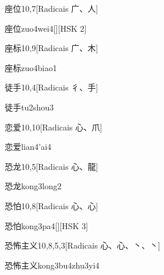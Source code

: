 \begin{entry}{座位}{10,7}[Radicais ⼴、⼈]
  \begin{phonetics}{座位}{zuo4wei4}[][HSK 2]
  \end{phonetics}
\end{entry}

\begin{entry}{座标}{10,9}[Radicais ⼴、⽊]
  \begin{phonetics}{座标}{zuo4biao1}
  \end{phonetics}
\end{entry}

\begin{entry}{徒手}{10,4}[Radicais ⼻、⼿]
  \begin{phonetics}{徒手}{tu2shou3}
  \end{phonetics}
\end{entry}

\begin{entry}{恋爱}{10,10}[Radicais ⼼、⽖]
  \begin{phonetics}{恋爱}{lian4'ai4}
  \end{phonetics}
\end{entry}

\begin{entry}{恐龙}{10,5}[Radicais ⼼、⿓]
  \begin{phonetics}{恐龙}{kong3long2}
  \end{phonetics}
\end{entry}

\begin{entry}{恐怕}{10,8}[Radicais ⼼、⼼]
  \begin{phonetics}{恐怕}{kong3pa4}[][HSK 3]
  \end{phonetics}
\end{entry}

\begin{entry}{恐怖主义}{10,8,5,3}[Radicais ⼼、⼼、⼂、⼂]
  \begin{phonetics}{恐怖主义}{kong3bu4zhu3yi4}
  \end{phonetics}
\end{entry}

